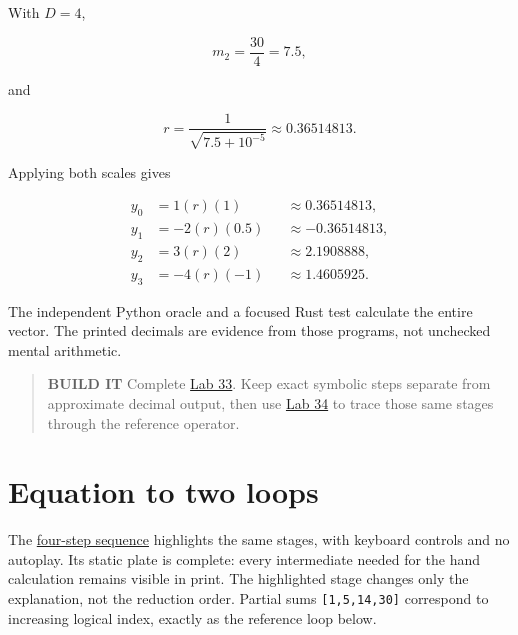 With \(D=4\),

\begin{equation}
m_2=\frac{30}{4}=7.5,
\end{equation}

and

\begin{equation}
r=\frac{1}{\sqrt{7.5+10^{-5}}}
\approx0.36514813.
\end{equation}

Applying both scales gives

\begin{equation}
\begin{aligned}
y_0&= 1(r)(1)       &&\approx 0.36514813,\\
y_1&=-2(r)(0.5)     &&\approx-0.36514813,\\
y_2&= 3(r)(2)       &&\approx 2.1908888,\\
y_3&=-4(r)(-1)      &&\approx 1.4605925.
\end{aligned}
\end{equation}

The independent Python oracle and a focused Rust test calculate the
entire vector. The printed decimals are evidence from those programs,
not unchecked mental arithmetic.

\begin{quote}
\textbf{BUILD IT} Complete
\href{https://github.com/hermonai/inside-the-llm-engine/blob/astra-visual-rewrite/labs/lab-33-compute-rms-by-hand.md}{Lab
33}. Keep exact symbolic steps separate from approximate decimal output,
then use
\href{https://github.com/hermonai/inside-the-llm-engine/blob/astra-visual-rewrite/labs/lab-34-implement-rmsnorm.md}{Lab
34} to trace those same stages through the reference operator.
\end{quote}

\section{Equation to two loops}\label{equation-to-two-loops}


The
\href{https://github.com/hermonai/inside-the-llm-engine/blob/astra-visual-rewrite/figures/generated/ch07-passes.html}{four-step
sequence} highlights the same stages, with keyboard controls and no
autoplay. Its static plate is complete: every intermediate needed for
the hand calculation remains visible in print. The highlighted stage
changes only the explanation, not the reduction order. Partial sums
\texttt{{[}1,5,14,30{]}} correspond to increasing logical index, exactly
as the reference loop below.

